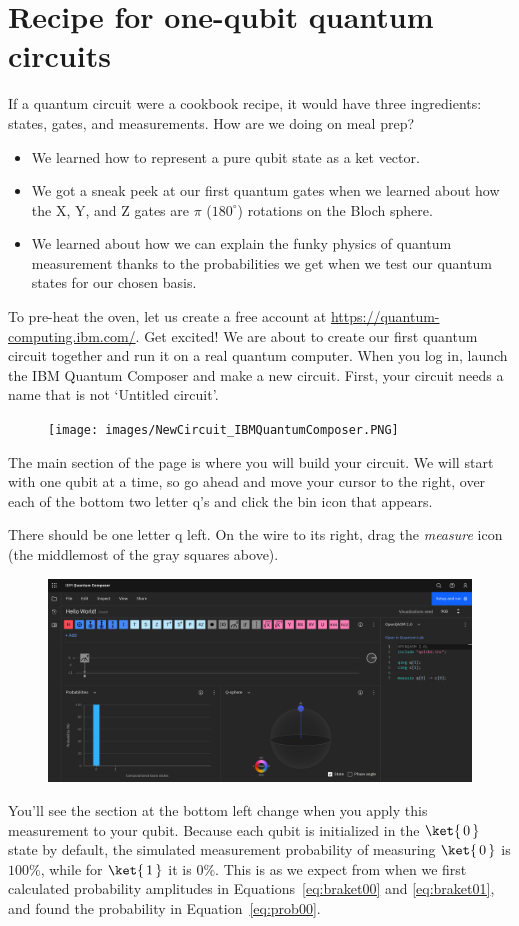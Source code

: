 \documentclass{article}
\theoremstyle{definition}
\newcommand{\kz}[1]{\ket{\,#1\,}}
\begin{document}
\section{Recipe for one-qubit quantum circuits}
If a quantum circuit were a cookbook recipe, it would have three ingredients: states, gates, and measurements.
How are we doing on meal prep?
\begin{itemize}
	\item We learned how to represent a pure qubit state as a ket vector.
	\item We got a sneak peek at our first quantum gates when we learned about how the X, Y, and Z gates are $\pi$ ($180^{\circ}$) rotations on the Bloch sphere.
	\item We learned about how we can explain the funky physics of quantum measurement thanks to the probabilities we get when we test our quantum states for our chosen basis.
\end{itemize}
To pre-heat the oven, let us create a free account at \url{https://quantum-computing.ibm.com/}.  Get excited!  We are about to create our first quantum circuit together and run it on a real quantum computer.
When you log in, launch the IBM Quantum Composer and make a new circuit.
First, your circuit needs a name that is not `Untitled circuit'.
\begin{figure}[H]
	\texttt{[image: images/NewCircuit\_IBMQuantumComposer.PNG]}
\end{figure}
The main section of the page is where you will build your circuit.  We will start with one qubit at a time, so go ahead and move your cursor to the right, over each of the bottom two letter q's and click the bin icon that appears.

There should be one letter q left.  On the wire to its right, drag the \textit{measure} icon (the middlemost of the gray squares above).
\begin{figure}[H]
	\includegraphics[width=\columnwidth]{images/Measure_IBMQuantumComposer.PNG}
\end{figure}
You'll see the section at the bottom left change when you apply this measurement to your qubit.  Because each qubit is initialized in the $\kz0$ state by default, the simulated measurement probability of measuring $\kz0$ is $100\%$, while for $\kz1$ it is $0\%$.  This is as we expect from when we first calculated probability amplitudes in Equations~\ref{eq:braket00} and \ref{eq:braket01}, and found the probability in Equation~\ref{eq:prob00}.
\end{document}
